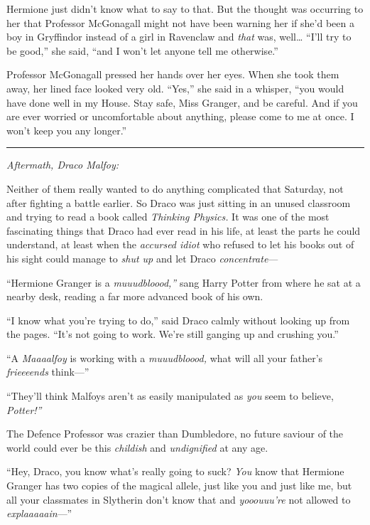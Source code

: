 Hermione just didn't know what to say to that. But the thought was
occurring to her that Professor McGonagall might not have been warning
her if she'd been a boy in Gryffindor instead of a girl in Ravenclaw and
\emph{that} was, well\ldots{} ``I'll try to be good,'' she said, ``and I
won't let anyone tell me otherwise.''

Professor McGonagall pressed her hands over her eyes. When she took them
away, her lined face looked very old. ``Yes,'' she said in a whisper,
``you would have done well in my House. Stay safe, Miss Granger, and be
careful. And if you are ever worried or uncomfortable about anything,
please come to me at once. I won't keep you any longer.''

\begin{center}\rule{3in}{0.4pt}\end{center}

\emph{Aftermath, Draco Malfoy:}

Neither of them really wanted to do anything complicated that Saturday,
not after fighting a battle earlier. So Draco was just sitting in an
unused classroom and trying to read a book called \emph{Thinking
Physics.} It was one of the most fascinating things that Draco had ever
read in his life, at least the parts he could understand, at least when
the \emph{accursed idiot} who refused to let his books out of his sight
could manage to \emph{shut up} and let Draco \emph{concentrate}---

``Hermione Granger is a \emph{muuudbloood,''} sang Harry Potter from
where he sat at a nearby desk, reading a far more advanced book of his
own.

``I know what you're trying to do,'' said Draco calmly without looking
up from the pages. ``It's not going to work. We're still ganging up and
crushing you.''

``A \emph{Maaaalfoy} is working with a \emph{muuudbloood,} what will all
your father's \emph{frieeeends} think---''

``They'll think Malfoys aren't as easily manipulated as \emph{you} seem
to believe, \emph{Potter!''}

The Defence Professor was crazier than Dumbledore, no future saviour of
the world could ever be this \emph{childish} and \emph{undignified} at
any age.

``Hey, Draco, you know what's really going to suck? \emph{You} know that
Hermione Granger has two copies of the magical allele, just like you and
just like me, but all your classmates in Slytherin don't know that and
\emph{yooouuu're} not allowed to \emph{explaaaaain}---''

